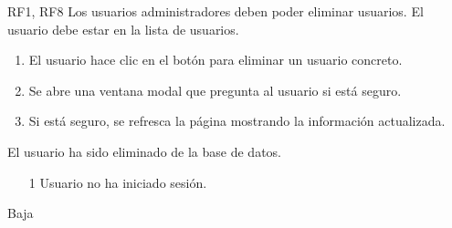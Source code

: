 {RF1, RF8}
{Los usuarios administradores deben poder eliminar usuarios.}
{El usuario debe estar en la lista de usuarios.}
{
    \begin{enumerate}
        \def\labelenumi{\arabic{enumi}.}
        \tightlist
        \item El usuario hace clic en el botón para eliminar un usuario concreto.
        \item Se abre una ventana modal que pregunta al usuario si está seguro.
        \item Si está seguro, se refresca la página mostrando la información actualizada.
    \end{enumerate}
}
{
    El usuario ha sido eliminado de la base de datos.
}
{
    \begin{itemize}
        \item [1] Usuario no ha iniciado sesión.
    \end{itemize}
}
{Baja}